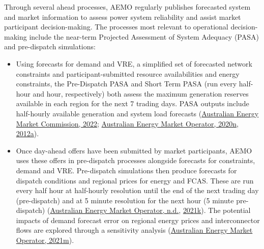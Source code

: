 \documentclass[12pt,a4paper,]{report}
\providecommand{\tightlist}{%
  \setlength{\itemsep}{0pt}\setlength{\parskip}{0pt}}
\begin{document}
Through several ahead processes, AEMO regularly publishes forecasted
system and market information to assess power system reliability and
assist market participant decision-making. The processes most relevant
to operational decision-making include the near-term Projected
Assessment of System Adequacy (PASA) and pre-dispatch simulations:

\begin{itemize}
\tightlist
\item
  Using forecasts for demand and VRE, a simplified set of forecasted
  network constraints and participant-submitted resource availabilities
  and energy constraints, the Pre-Dispatch PASA and Short Term PASA (run
  every half-hour and hour, respectively) both assess the maximum
  generation reserves available in each region for the next 7 trading
  days. PASA outputs include half-hourly available generation and system
  load forecasts
  (\protect\hyperlink{ref-australianenergymarketcommissionUpdatingShortTerm2022}{Australian
  Energy Market Commission, 2022};
  \protect\hyperlink{ref-australianenergymarketoperatorReliabilityStandardImplementation2020}{Australian
  Energy Market Operator, 2020n},
  \protect\hyperlink{ref-australianenergymarketoperatorShortTermPASA2012}{2012a}).
\item
  Once day-ahead offers have been submitted by market participants, AEMO
  uses these offers in pre-dispatch processes alongside forecasts for
  constraints, demand and VRE. Pre-dispatch simulations then produce
  forecasts for dispatch conditions and regional prices for energy and
  FCAS. These are run every half hour at half-hourly resolution until
  the end of the next trading day (pre-dispatch) and at 5 minute
  resolution for the next hour (5 minute pre-dispatch)
  (\protect\hyperlink{ref-australianenergymarketoperatorPreDispatch}{Australian
  Energy Market Operator, n.d.},
  \protect\hyperlink{ref-australianenergymarketoperatorPredispatchOperatingProcedure2021}{2021k}).
  The potential impacts of demand forecast error on regional energy
  prices and interconnector flows are explored through a sensitivity
  analysis
  (\protect\hyperlink{ref-australianenergymarketoperatorPreDispatchSensitivities2021}{Australian
  Energy Market Operator, 2021m}).
\end{itemize}
\end{document}
